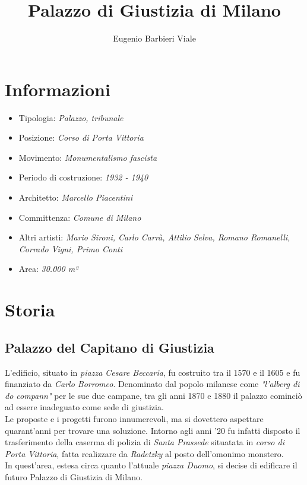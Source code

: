 \documentclass[12pt]{article}
\title{Palazzo di Giustizia di Milano}
\author{Eugenio Barbieri Viale}
\date{}
\begin{document}
\setlength{\parindent}{0pt}
\maketitle

\tableofcontents

\vspace{10em}

\section{Informazioni}
\begin{itemize}
  \item Tipologia: \textit{Palazzo, tribunale}
  \item Posizione: \textit{Corso di Porta Vittoria}
  \item Movimento: \textit{Monumentalismo fascista}
  \item Periodo di costruzione: \textit{1932 - 1940}
  \item Architetto: \textit{Marcello Piacentini}
  \item Committenza: \textit{Comune di Milano}
  \item Altri artisti: \textit{Mario Sironi, Carlo Carrà, Attilio Selva, Romano Romanelli, Corrado Vigni, Primo Conti}
  \item Area: \textit{30.000 m²}
\end{itemize}

\newpage
\section{Storia}

\vspace{1em}

\subsection{Palazzo del Capitano di Giustizia}
L'edificio, situato in \textit{piazza Cesare Beccaria}, fu costruito tra il 1570 e il 1605 e fu finanziato da \textit{Carlo Borromeo}. Denominato dal popolo milanese come \textit{"l'alberg di do compann"} per le sue due campane, tra gli anni 1870 e 1880 il palazzo cominciò ad essere inadeguato come sede di giustizia. \\
Le proposte e i progetti furono innumerevoli, ma si dovettero aspettare quarant'anni per trovare una soluzione. Intorno agli anni '20 fu infatti disposto il trasferimento della caserma di polizia di \textit{Santa Prassede} situatata in \textit{corso di Porta Vittoria}, fatta realizzare da \textit{Radetzky} al posto dell'omonimo monstero. \\
In quest'area, estesa circa quanto l'attuale \textit{piazza Duomo}, si decise di edificare il futuro Palazzo di Giustizia di Milano.
\end{document}
